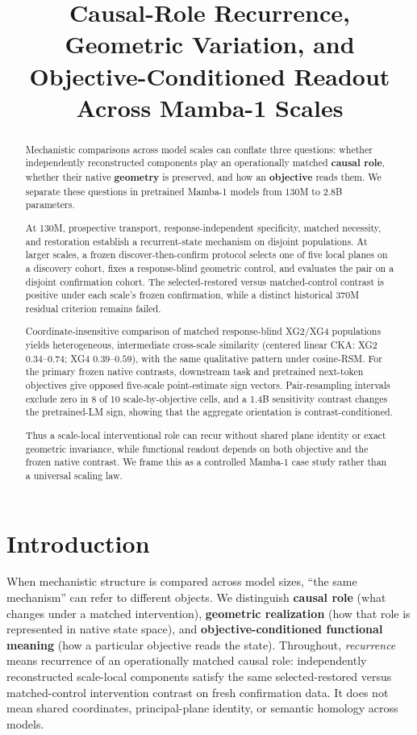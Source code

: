 \documentclass{article}
\title{Causal-Role Recurrence, Geometric Variation, and Objective-Conditioned Readout Across Mamba-1 Scales}
\author{}
\begin{document}
\maketitle

\begin{abstract}

Mechanistic comparisons across model scales can conflate three questions: whether independently reconstructed components play an operationally matched \textbf{causal role}, whether their native \textbf{geometry} is preserved, and how an \textbf{objective} reads them. We separate these questions in pretrained Mamba-1 models from 130M to 2.8B parameters.

At 130M, prospective transport, response-independent specificity, matched necessity, and restoration establish a recurrent-state mechanism on disjoint populations. At larger scales, a frozen discover-then-confirm protocol selects one of five local planes on a discovery cohort, fixes a response-blind geometric control, and evaluates the pair on a disjoint confirmation cohort. The selected-restored versus matched-control contrast is positive under each scale's frozen confirmation, while a distinct historical 370M residual criterion remains failed.

Coordinate-insensitive comparison of matched response-blind XG2/XG4 populations yields heterogeneous, intermediate cross-scale similarity (centered linear CKA: XG2 $0.34$--$0.74$; XG4 $0.39$--$0.59$), with the same qualitative pattern under cosine-RSM. For the primary frozen native contrasts, downstream task and pretrained next-token objectives give opposed five-scale point-estimate sign vectors. Pair-resampling intervals exclude zero in 8 of 10 scale-by-objective cells, and a 1.4B sensitivity contrast changes the pretrained-LM sign, showing that the aggregate orientation is contrast-conditioned.

Thus a scale-local interventional role can recur without shared plane identity or exact geometric invariance, while functional readout depends on both objective and the frozen native contrast. We frame this as a controlled Mamba-1 case study rather than a universal scaling law.

\end{abstract}
\section{Introduction}
\label{sec:intro}

When mechanistic structure is compared across model sizes, ``the same mechanism'' can refer to different objects. We distinguish \textbf{causal role} (what changes under a matched intervention), \textbf{geometric realization} (how that role is represented in native state space), and \textbf{objective-conditioned functional meaning} (how a particular objective reads the state). Throughout, \emph{recurrence} means recurrence of an operationally matched causal role: independently reconstructed scale-local components satisfy the same selected-restored versus matched-control intervention contrast on fresh confirmation data. It does not mean shared coordinates, principal-plane identity, or semantic homology across models.
\end{document}
